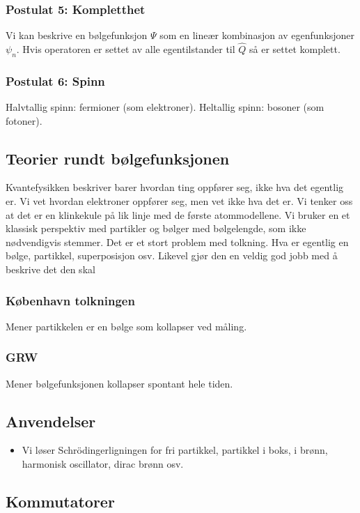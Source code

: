 \subsubsection*{Postulat 5: Kompletthet}
Vi kan beskrive en bølgefunksjon $Ψ$ som en lineær kombinasjon av egenfunksjoner $ψ_n$. Hvis operatoren er settet av alle egentilstander til $\hat{Q}$ så er settet komplett.

\subsubsection*{Postulat 6: Spinn}
Halvtallig spinn: fermioner (som elektroner). 
Heltallig spinn: bosoner (som fotoner).
  
\subsection{Teorier rundt bølgefunksjonen}
Kvantefysikken beskriver barer hvordan ting oppfører seg, ikke hva det egentlig er. Vi vet hvordan elektroner oppfører seg, men vet ikke hva det er. Vi tenker oss at det er en klinkekule på lik linje med de første atommodellene. Vi bruker en et klassisk perspektiv med partikler og bølger med bølgelengde, som ikke nødvendigvis stemmer. Det er et stort problem med tolkning. Hva er egentlig en bølge, partikkel, superposisjon osv. Likevel gjør den en veldig god jobb med å beskrive det den skal 
\subsubsection*{København tolkningen}
Mener partikkelen er en bølge som kollapser ved måling. 

\subsubsection*{GRW}
Mener bølgefunksjonen kollapser spontant hele tiden. 


\subsection{Anvendelser}
\begin{itemize}
    \item Vi løser Schrödingerligningen for fri partikkel, partikkel i boks, i brønn, harmonisk oscillator, dirac brønn osv. 
\end{itemize}
  
\subsection{Kommutatorer}
